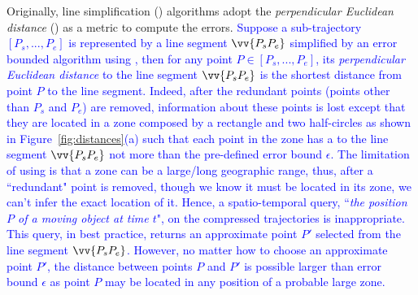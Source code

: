 Originally, line simplification (\lsa) algorithms adopt the \emph{perpendicular Euclidean distance} (\ped) as a metric to compute the errors.
\textcolor{blue}{Suppose a sub-trajectory $[P_s, ..., P_e]$ is represented by a line segment $\vv{P_sP_e}$  simplified by an error bounded \lsa algorithm using \ped, then for any point $P \in [P_s, ..., P_e]$, its \emph{perpendicular Euclidean distance} to the line segment $\vv{P_sP_e}$  is the shortest distance from point $P$ to the line segment.}
\textcolor{blue}{Indeed, after the redundant points (points other than $P_s$ and $P_e$) are removed, information about these points is lost except that they are located in a zone composed by a rectangle and two half-circles as shown in Figure~\ref{fig:distances}(a) such that each point in the zone has a \ped to the line segment $\vv{P_sP_e}$ not more than the pre-defined error bound $\epsilon$.}
\textcolor{blue}{The limitation of using \ped is that a zone can be a large/long geographic range, thus, after a ``redundant" point is removed, though we know it must be located in its zone, we can't infer the exact location of it.}
%
\textcolor{blue}{Hence, a spatio-temporal query, \eg ``\emph{the position $P$ of a moving object at time $t$}", on the compressed trajectories is inappropriate. This query, in best practice, returns an approximate point $P'$ selected from the line segment $\vv{P_sP_e}$. However, no matter how to choose an approximate point $P'$, the distance between points $P$ and $P'$ is possible larger than error bound $\epsilon$ as point $P$ may be located in any position of a probable large zone.}
%





